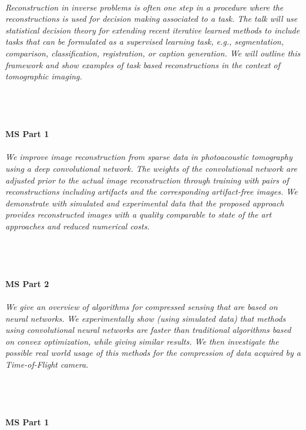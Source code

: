 \begin{multicols}{2}
\\  
    \textit{Reconstruction in inverse problems is often one step in a procedure where the reconstructions is used for decision making associated to a task. The talk will use statistical decision theory for extending recent iterative learned methods to include tasks that can be formulated as a supervised learning task, e.g., segmentation, comparison, classification, registration, or caption generation. We will outline this framework and show examples of task based reconstructions in the context of tomographic imaging.}\\
\\ 
    \\
    \\\\
    \noindent\textbf{MS Part 1}\\
\\  
    \textit{We improve image reconstruction from sparse data in photoacoustic tomography using a deep convolutional network. The weights of the convolutional network are adjusted prior to the actual image reconstruction through training with pairs of reconstructions including artifacts and the corresponding artifact-free images. We demonstrate with simulated and experimental data that the proposed approach provides reconstructed images with a quality comparable to state of the art approaches and reduced numerical costs.}\\
\\ 
    \\
    \\\\
    \noindent\textbf{MS Part 2}\\
\\  
    \textit{We give an overview of algorithms for compressed sensing that are based on neural networks. We experimentally show (using simulated data) that methods using convolutional neural networks are faster than traditional algorithms based on convex optimization, while giving similar results. We then investigate the possible real world usage of this methods for the compression of data acquired by a Time-of-Flight camera.}\\
\\ 
    \\
    \\\\
    \noindent\textbf{MS Part 1}\\

\end{multicols}
